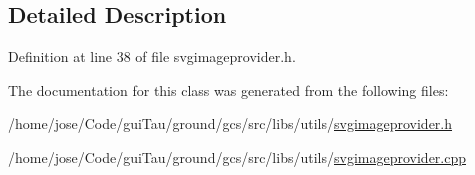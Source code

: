 \subsection{Detailed Description}


Definition at line 38 of file svgimageprovider.\-h.



The documentation for this class was generated from the following files\-:\begin{DoxyCompactItemize}
\item 
/home/jose/\-Code/gui\-Tau/ground/gcs/src/libs/utils/\hyperlink{svgimageprovider_8h}{svgimageprovider.\-h}\item 
/home/jose/\-Code/gui\-Tau/ground/gcs/src/libs/utils/\hyperlink{svgimageprovider_8cpp}{svgimageprovider.\-cpp}\end{DoxyCompactItemize}
